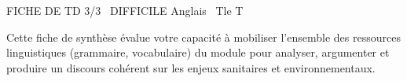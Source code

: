 \documentclass[11pt]{article}
\begin{document}
\begin{tcolorbox}[enhanced,colback=popink,colframe=popink,arc=10pt,boxrule=0pt,left=12pt,right=12pt,top=9pt,bottom=9pt]
{\color{white}\popxbold\small FICHE DE TD 3/3 \textbullet\ DIFFICILE \hfill Anglais \textbullet\ Tle T\par}
\end{tcolorbox}
\vspace{4pt}
\noindent Cette fiche de synthèse évalue votre capacité à mobiliser l'ensemble des ressources linguistiques (grammaire, vocabulaire) du module pour analyser, argumenter et produire un discours cohérent sur les enjeux sanitaires et environnementaux.
\end{document}
